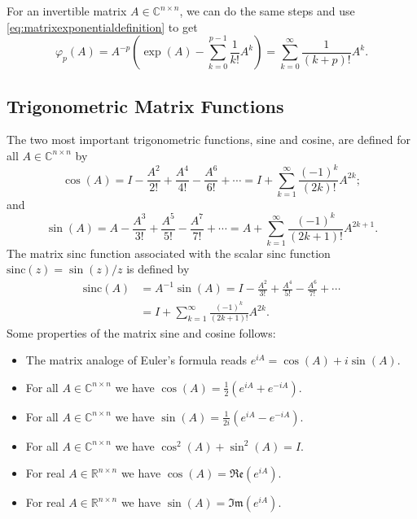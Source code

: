 For an invertible matrix $A \in \mathbb{C}^{n \times n}$, we can do the same steps
and use \eqref{eq:matrixexponentialdefinition} to get
\begin{equation}
    \label{eq:matrixphifunctionsclosedform}
    \varphi_p(A) = A^{-p} \left( \exp(A) - \sum_{k=0}^{p-1}{\frac{1}{k!}A^{k}} \right)
    = \sum_{k=0}^{\infty}{\frac{1}{(k+p)!} A^{k}}.
\end{equation}

\subsection{Trigonometric Matrix Functions}
\label{sec:trigonometricmatrixfunctions}

The two most important trigonometric functions, sine and cosine, are defined
\cite{higham2008functions} for all $A \in \mathbb{C}^{n \times n}$ by
\begin{equation}
    \label{eq:matrixcosinedefinition}
    \cos(A) = I - \frac{A^2}{2!} + \frac{A^4}{4!} - \frac{A^6}{6!} + \cdots
    = I + \sum_{k=1}^{\infty}{\frac{(-1)^k}{(2k)!} A^{2k}};
\end{equation}
and
\begin{equation}
    \label{eq:matrixsinedefinition}
    \sin(A) = A - \frac{A^3}{3!} + \frac{A^5}{5!} - \frac{A^7}{7!} + \cdots
    = A + \sum_{k=1}^{\infty}{\frac{(-1)^k}{(2k+1)!} A^{2k+1}}.
\end{equation}
The matrix sinc function associated with the scalar sinc function
$\mathrm{sinc}(z) = \sin(z) / z$ is defined by
\begin{equation}
    \label{eq:matrixsincdefinition}
    \begin{aligned}
        \mathrm{sinc}(A) & = A^{-1} \sin(A)
        = I - \frac{A^2}{3!} + \frac{A^4}{5!} - \frac{A^6}{7!} + \cdots \\
        & = I + \sum_{k=1}^{\infty}{\frac{(-1)^k}{(2k+1)!} A^{2k}}.
    \end{aligned}
\end{equation}
Some properties of the matrix sine and cosine follows:
\begin{itemize}
    \item The matrix analoge of Euler's formula reads $e^{iA} = \cos(A) + i \sin(A)$.
    \item For all $A \in \mathbb{C}^{n \times n}$ we have $\cos(A) = \frac{1}{2} (e^{iA} + e^{-iA})$.
    \item For all $A \in \mathbb{C}^{n \times n}$ we have $\sin(A) = \frac{1}{2i} (e^{iA} - e^{-iA})$.
    \item For all $A \in \mathbb{C}^{n \times n}$ we have $\cos^2(A) + \sin^2(A) = I$.
    \item For real $A \in \mathbb{R}^{n \times n}$ we have $\cos(A) = \mathfrak{Re}(e^{iA})$.
    \item For real $A \in \mathbb{R}^{n \times n}$ we have $\sin(A) = \mathfrak{Im}(e^{iA})$.
\end{itemize}

